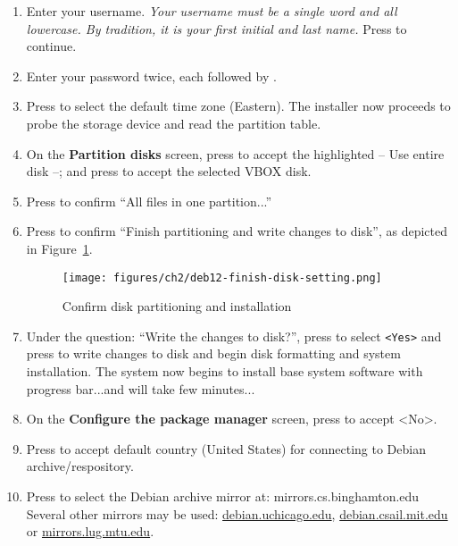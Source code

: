 \begin{enumerate}
\item Enter your username. {\it{Your username must be a single word and all lowercase. By tradition, it is your first initial and last name.}} Press {} to continue. 

\item Enter your password twice, each followed by {}. 

\item Press {} to select the default time zone (Eastern). The installer now proceeds to probe the storage device and read the partition table. 

\item On the {\bf{Partition disks}} screen, press {} to accept the highlighted -- Use entire disk --; and press {} to accept the selected VBOX disk. 

\item Press {} to confirm ``All files in one partition...'' 

\item Press {} to confirm ``Finish partitioning and write changes to disk'', as depicted in Figure~\ref{fig:deb12-finish-disk-setting}. 

\begin{figure}[hbt!]\centering
   \texttt{[image: figures/ch2/deb12-finish-disk-setting.png]}
   \caption{Confirm disk partitioning and installation} \label{fig:deb12-finish-disk-setting} %
\end{figure}

\item Under the question: ``Write the changes to disk?'', press {} to select {\tt{<Yes>}} and press {} to write changes to disk and begin disk formatting and system installation. The system now begins to install base system software with progress bar...and will take few minutes...

\item On the {\bf{Configure the package manager}} screen, press {} to accept <No>. 

\item Press {} to accept default country (United States) for connecting to Debian archive/respository. 

\item Press {\keys{$\downarrow$}} to select the Debian archive mirror at: \newline 
mirrors.cs.binghamton.edu \newline 
Several other mirrors may be used: {\url{debian.uchicago.edu}}, {\url{debian.csail.mit.edu}} or {\url{mirrors.lug.mtu.edu}}.  


\end{enumerate}
